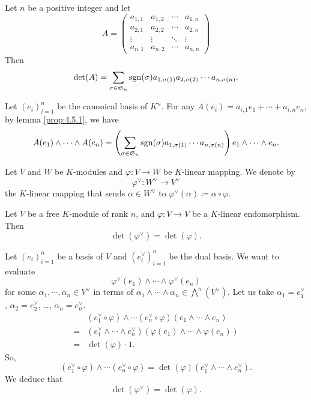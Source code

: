 \begin{propositionenv}\label{thm:Matrix.det_apply'}
    Let $n$ be a positive integer and let
    $$ A = 
    \begin{pmatrix}
        a_{1,1} & a_{1,2} & \cdots & a_{1,n}\\
        a_{2,1} & a_{2,2} & \cdots & a_{2,n}\\
        \vdots & \vdots & \ddots & \vdots\\
        a_{n,1} & a_{n,2} & \cdots & a_{n,n}
    \end{pmatrix}
    $$
    Then 
    $$ \det (A) = \sum_{\sigma \in \mathfrak{S}_n} \operatorname{\mathrm{sgn}} (\sigma) a_{1,\sigma(1)} a_{2,\sigma(2)} \cdots a_{n,\sigma(n)}.$$
\end{propositionenv}
\begin{proofenv}
    Let $\left(e_i\right)_{i=1}^{n}$ be the canonical basis of $K^n$.
    For any $ A(e_i) = a_{i,1} e_1 + \cdots + a_{i,n} e_n$, by lemma \ref{prop:4.5.1}, we have
    $$ A(e_1) \wedge \cdots \wedge A(e_n) = \left(\sum_{\sigma \in \mathfrak{S}_n} \operatorname{\mathrm{sgn}} (\sigma) a_{1,\sigma(1)} \cdots a_{n,\sigma(n)}\right)e_1 \wedge \cdots \wedge e_n.$$
\end{proofenv}

\begin{definitionenv}
    Let $V$ and $W$ be $K$-modules and $\varphi : V\rightarrow W$ be $K$-linear mapping.
    We denote by 
    $$ \varphi^\vee : W^\vee \rightarrow V^\vee$$
    the $K$-linear mapping that sends $\alpha \in W^\vee$ to $\varphi^\vee(\alpha) \coloneq \alpha \circ \varphi$.
\end{definitionenv}

\begin{propositionenv}\label{thm:LinearMap.det_dualMap}
    Let $V$ be a free $K$-module of rank $n$, and $\varphi : V \rightarrow V$ be a $K$-linear endomorphism.
    Then
    $$ \det (\varphi^\vee) = \det (\varphi).$$
\end{propositionenv}
\begin{proofenv}
    Let $\left(e_i\right)_{i=1}^{n}$ be a basis of $V$ and $\left(e_i^{\vee}\right)_{i=1}^{n}$ be the dual basis.
    We want to evaluate 
    $$ \varphi^\vee (e_1) \wedge \cdots \wedge \varphi^\vee (e_n)$$
    for some $\alpha_1,\cdots,\alpha_n \in V^\vee$ in terms of $\alpha_1 \wedge \cdots \wedge \alpha_n \in \bigwedge^n (V^\vee)$.
    Let us take $\alpha_1 = e_1^\vee$, $\alpha_2 = e_2^\vee$, …, $ \alpha_n = e_n^\vee$.
    $$\begin{aligned}
        &\left(e_1^\vee \circ \varphi\right) \wedge \cdots \left(e_n^\vee \circ \varphi\right)(e_1 \wedge \cdots \wedge e_n)\\
        = & \left(e_1^\vee \wedge \cdots \wedge e_n^\vee\right)\left(\varphi(e_1) \wedge \cdots \wedge \varphi(e_n)\right)\\
        = & \det (\varphi) \cdot 1.
    \end{aligned}$$
    So,
    $$\left(e_1^\vee \circ \varphi\right) \wedge \cdots \left(e_n^\vee \circ \varphi\right) = \det (\varphi) \left(e_1^\vee \wedge \cdots \wedge e_n^\vee\right).$$
    We deduce that 
    $$ \det (\varphi^\vee) = \det (\varphi).$$
\end{proofenv}

